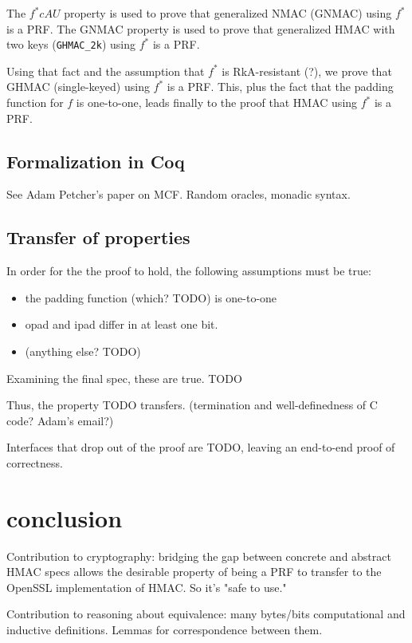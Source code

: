 \documentclass[twocolumn,showpacs,%
  nofootinbib,aps,superscriptaddress,%
  eqsecnum,prd,notitlepage,showkeys,10pt]{revtex4-1}
\begin{document}
The $f^* cAU$ property is used to prove that generalized NMAC (GNMAC) using $f^*$ is a PRF. The GNMAC property is used to prove that generalized HMAC with two keys (\verb|GHMAC_2k|) using $f^*$ is a PRF.

Using that fact and the assumption that $f^*$ is RkA-resistant (?), we prove that GHMAC (single-keyed) using $f^*$ is a PRF. This, plus the fact that the padding function for $f$ is one-to-one, leads finally to the proof that HMAC using $f^*$ is a PRF.


\subsection{Formalization in Coq}

See Adam Petcher's paper on MCF. Random oracles, monadic syntax.

\subsection{Transfer of properties}

In order for the the proof to hold, the following assumptions must be true:
\begin{itemize}
\item the padding function (which? TODO) is one-to-one
\item opad and ipad differ in at least one bit.
\item (anything else? TODO)
\end{itemize}

Examining the final spec, these are true. TODO

Thus, the property TODO transfers. (termination and well-definedness of C code? Adam's email?)

Interfaces that drop out of the proof are TODO, leaving an end-to-end proof of correctness.

\section{conclusion}

Contribution to cryptography: bridging the gap between concrete and abstract HMAC specs allows the desirable property of being a PRF to transfer to the OpenSSL implementation of HMAC. So it's "safe to use."

Contribution to reasoning about equivalence: many bytes/bits computational and inductive definitions. Lemmas for correspondence between them. 
\end{document}
